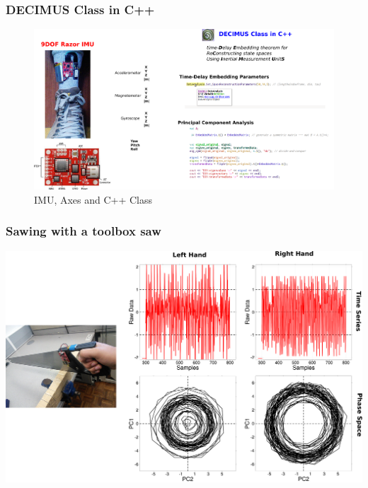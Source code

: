 \documentclass{beamer}
\begin{document}
% 
% 
% 
% 

\begin{frame}
\frametitle{DECIMUS Class in C++}

\begin{figure}
\includegraphics[scale=0.2]{procedure} \\
IMU, Axes and C++ Class
\end{figure}  
\end{frame}

 


\begin{frame}
\frametitle{Sawing  with a toolbox saw}
\vspace{-5mm}

 \includegraphics[scale=.045]{toolboxsaw} 

\end{frame}
\end{document}
